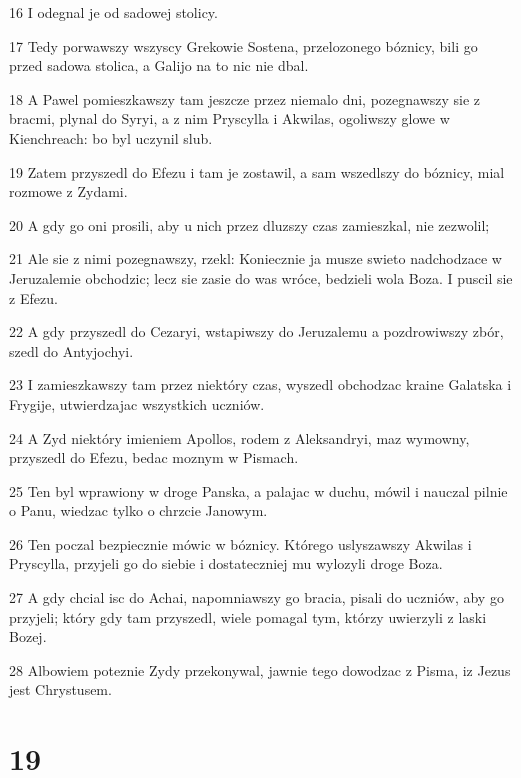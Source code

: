 \par 16 I odegnal je od sadowej stolicy.
\par 17 Tedy porwawszy wszyscy Grekowie Sostena, przelozonego bóznicy, bili go przed sadowa stolica, a Galijo na to nic nie dbal.
\par 18 A Pawel pomieszkawszy tam jeszcze przez niemalo dni, pozegnawszy sie z bracmi, plynal do Syryi, a z nim Pryscylla i Akwilas, ogoliwszy glowe w Kienchreach: bo byl uczynil slub.
\par 19 Zatem przyszedl do Efezu i tam je zostawil, a sam wszedlszy do bóznicy, mial rozmowe z Zydami.
\par 20 A gdy go oni prosili, aby u nich przez dluzszy czas zamieszkal, nie zezwolil;
\par 21 Ale sie z nimi pozegnawszy, rzekl: Koniecznie ja musze swieto nadchodzace w Jeruzalemie obchodzic; lecz sie zasie do was wróce, bedzieli wola Boza. I puscil sie z Efezu.
\par 22 A gdy przyszedl do Cezaryi, wstapiwszy do Jeruzalemu a pozdrowiwszy zbór, szedl do Antyjochyi.
\par 23 I zamieszkawszy tam przez niektóry czas, wyszedl obchodzac kraine Galatska i Frygije, utwierdzajac wszystkich uczniów.
\par 24 A Zyd niektóry imieniem Apollos, rodem z Aleksandryi, maz wymowny, przyszedl do Efezu, bedac moznym w Pismach.
\par 25 Ten byl wprawiony w droge Panska, a palajac w duchu, mówil i nauczal pilnie o Panu, wiedzac tylko o chrzcie Janowym.
\par 26 Ten poczal bezpiecznie mówic w bóznicy. Którego uslyszawszy Akwilas i Pryscylla, przyjeli go do siebie i dostateczniej mu wylozyli droge Boza.
\par 27 A gdy chcial isc do Achai, napomniawszy go bracia, pisali do uczniów, aby go przyjeli; który gdy tam przyszedl, wiele pomagal tym, którzy uwierzyli z laski Bozej.
\par 28 Albowiem poteznie Zydy przekonywal, jawnie tego dowodzac z Pisma, iz Jezus jest Chrystusem.

\chapter{19}


